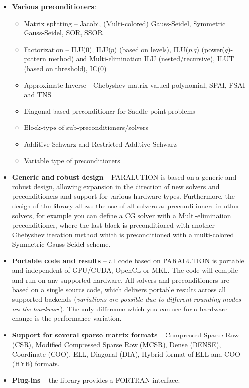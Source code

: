 \begin{itemize}
  \item {\bf Various preconditioners}:
\begin{itemize}
  \item Matrix splitting -- Jacobi, (Multi-colored) Gauss-Seidel, Symmetric Gauss-Seidel, SOR, SSOR
  \item Factorization -- ILU($0$), ILU($p$) (based on levels), ILU($p$,$q$) (power($q$)-pattern method) and Multi-elimination ILU (nested/recursive), ILUT (based on threshold), IC($0$)
  \item Approximate Inverse - Chebyshev matrix-valued polynomial, SPAI, FSAI and TNS
  \item Diagonal-based preconditioner for Saddle-point problems
  \item Block-type of sub-preconditioners/solvers
  \item Additive Schwarz and Restricted Additive Schwarz
  \item Variable type of preconditioners
\end{itemize}

  \item {\bf Generic and robust design} -- {PARALUTION} is based on a generic and robust design, allowing expansion in the direction of new solvers and preconditioners and support for various hardware types. Furthermore, the design of the library allows the use of all solvers as preconditioners in other solvers, for example you can define a CG solver with a Multi-elimination preconditioner, where the last-block is preconditioned with another Chebyshev iteration method which is preconditioned with a multi-colored Symmetric Gauss-Seidel scheme.

  \item {\bf Portable code and results} -- all code based on {PARALUTION} is portable and independent of GPU/CUDA, OpenCL or MKL. The code will compile and run on any supported hardware. All solvers and preconditioners are based on a single source code, which delivers portable results across all supported backends ({\it variations are possible due to different rounding modes on the hardware}). The only difference which you can see for a hardware change is the performance variation.

  \item {\bf Support for several sparse matrix formats} -- Compressed Sparse Row (CSR), Modified Compressed Sparse Row (MCSR), Dense (DENSE), Coordinate (COO), ELL, Diagonal (DIA), Hybrid format of ELL and COO (HYB) formats.

  \item {\bf Plug-ins} -- the library provides a FORTRAN interface.
  
  
\end{itemize}


